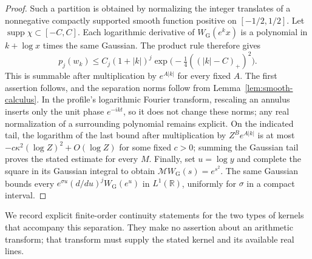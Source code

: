 \documentclass[11pt,a4paper]{article}
\numberwithin{equation}{section}
\numberwithin{figure}{section}
\theoremstyle{definition}
\theoremstyle{remark}
\begin{document}
\begin{proof}
Such a partition is obtained by normalizing the integer translates of a
nonnegative compactly supported smooth function positive on $[-1/2,1/2]$.
Let $\operatorname{supp}\chi\subset[-C,C]$.  Each logarithmic derivative of
$W_{\mathrm G}(e^k x)$ is a polynomial in $k+\log x$ times the same Gaussian.
The product rule therefore gives
\[
 p_j(w_k)\le C_j(1+|k|)^j
             \exp\bigl(-\tfrac14((|k|-C)_+)^2\bigr).
\]
This is summable after multiplication by $e^{A|k|}$ for every fixed $A$.
The first assertion follows, and the separation norms follow from
Lemma~\ref{lem:smooth-calculus}.  In the profile's logarithmic Fourier
transform, rescaling an annulus inserts only the unit phase $e^{-ikt}$, so it
does not change these norms; any real normalization of a surrounding
polynomial remains explicit.  On the indicated
tail, the logarithm of the last bound after multiplication by $Z^Be^{A|k|}$
is at most $-c\kappa^2(\log Z)^2+O(\log Z)$ for some fixed $c>0$; summing
the Gaussian tail proves the stated estimate for every $M$.  Finally, set
$u=\log y$ and complete the square in its Gaussian integral to obtain
$\mathcal MW_{\mathrm G}(s)=e^{s^2}$.  The same Gaussian bounds every
$e^{\sigma u}(d/du)^jW_{\mathrm G}(e^u)$ in $L^1(\mathbb R)$, uniformly
for $\sigma$ in a compact interval.
\end{proof}

We record explicit finite-order continuity statements for the two types of
kernels that accompany this separation.  They make no assertion about an
arithmetic transform; that transform must supply the stated kernel and its
available real lines.
\end{document}
